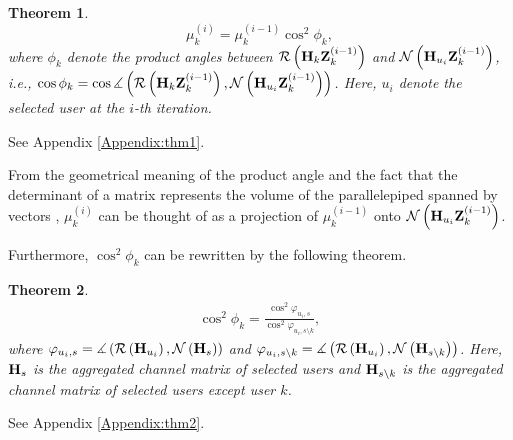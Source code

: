 \documentclass[journal,twoside]{IEEEtranTCOM}
\begin{document}
\newtheorem{theorem}{Theorem}

\begin{theorem}  \label{thm:relationship}
\begin{equation} \label{eq:mu3}
\mu _k^{(i)} = \mu _k^{(i-1)}{\cos^2 \phi_k},
\end{equation}
where $\phi_k$ denote the product angles between ${\cal{R}}\left({{\bf{H}}_k}{\bf{Z}}_k^{(i-1)}\right)$ and ${\cal{N}}\left({{\bf{H}}_{u_{i}}}{\bf{Z}}_k^{(i-1)}\right)$, i.e., $\cos \phi_k=\cos \measuredangle \left({\cal{R}}\left({{\bf{H}}_k}{\bf{Z}}_k^{(i-1)}\right), {\cal{N}}\left({{\bf{H}}_{u_{i}}}{\bf{Z}}_k^{(i-1)}\right)\right)$. Here, $u_i$ denote the selected user at the $i$-th iteration.
\end{theorem}
\begin{IEEEproof}
See Appendix \ref{Appendix:thm1}.
\end{IEEEproof}


From the geometrical meaning of the product angle and the fact that the determinant of a matrix represents the volume of the parallelepiped spanned by vectors \cite{Determinant}, $\mu _k^{(i)}$ can be thought of as a projection of $\mu _k^{(i-1)}$ onto ${\cal{N}}\left({{\bf{H}}_{u_{i}}}{\bf{Z}}_k^{(i-1)}\right)$.

Furthermore, ${\cos^2 \phi_k}$ can be rewritten by the following theorem.
\begin{theorem} \label{thm:lowerbound}
\begin{eqnarray}
\cos^2 \phi_k = \frac{\cos^2 \varphi_{{u_i}, s} } {\cos^2 \varphi_{{u_i}, s \setminus k } },
\end{eqnarray}
where $\varphi_{{u_i}, s} = \measuredangle \left({\cal{R}}\left({{\bf{H}}_{u_i}}\right), {\cal{N}}\left({{\bf{H}}_{s}} \right)\right)$ and $\varphi_{{u_i}, s \setminus k } = \measuredangle \left({\cal{R}}\left({{\bf{H}}_{u_i}}\right), {\cal{N}}\left({{\bf{H}}_{s \setminus k}} \right)\right)$. Here, ${{\bf{H}}_{s}}$ is the aggregated channel matrix of selected users and ${{\bf{H}}_{s \setminus k}}$ is the aggregated channel matrix of selected users except user $k$.
\end{theorem}
\begin{IEEEproof}
See Appendix \ref{Appendix:thm2}.
\end{IEEEproof}
\end{document}
